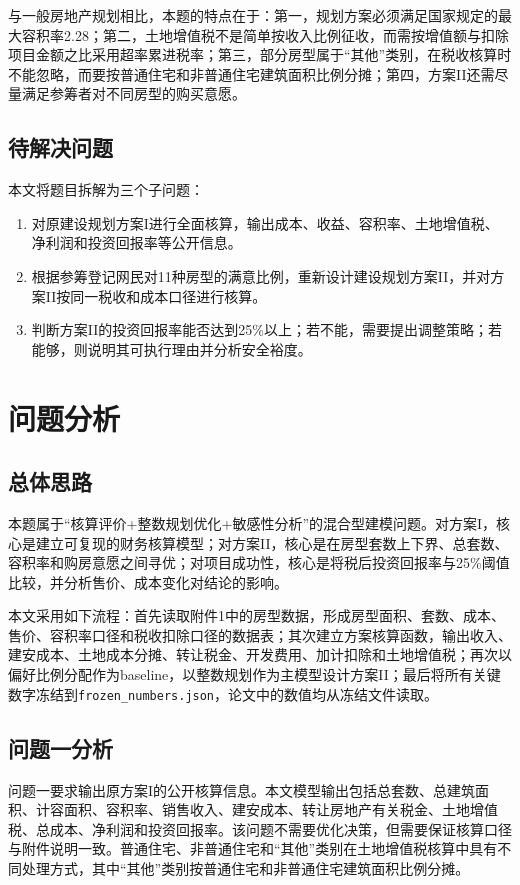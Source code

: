 \documentclass[UTF8,12pt,a4paper]{ctexart}
\begin{document}
与一般房地产规划相比，本题的特点在于：第一，规划方案必须满足国家规定的最大容积率2.28；第二，土地增值税不是简单按收入比例征收，而需按增值额与扣除项目金额之比采用超率累进税率；第三，部分房型属于“其他”类别，在税收核算时不能忽略，而要按普通住宅和非普通住宅建筑面积比例分摊；第四，方案II还需尽量满足参筹者对不同房型的购买意愿。

\subsection{待解决问题}
本文将题目拆解为三个子问题：
\begin{enumerate}[label=\textbf{问题\arabic*：},leftmargin=3.2em]
\item 对原建设规划方案I进行全面核算，输出成本、收益、容积率、土地增值税、净利润和投资回报率等公开信息。
\item 根据参筹登记网民对11种房型的满意比例，重新设计建设规划方案II，并对方案II按同一税收和成本口径进行核算。
\item 判断方案II的投资回报率能否达到25\%以上；若不能，需要提出调整策略；若能够，则说明其可执行理由并分析安全裕度。
\end{enumerate}

\section{问题分析}
\subsection{总体思路}
本题属于“核算评价+整数规划优化+敏感性分析”的混合型建模问题。对方案I，核心是建立可复现的财务核算模型；对方案II，核心是在房型套数上下界、总套数、容积率和购房意愿之间寻优；对项目成功性，核心是将税后投资回报率与25\%阈值比较，并分析售价、成本变化对结论的影响。

本文采用如下流程：首先读取附件1中的房型数据，形成房型面积、套数、成本、售价、容积率口径和税收扣除口径的数据表；其次建立方案核算函数，输出收入、建安成本、土地成本分摊、转让税金、开发费用、加计扣除和土地增值税；再次以偏好比例分配作为baseline，以整数规划作为主模型设计方案II；最后将所有关键数字冻结到\texttt{frozen\_numbers.json}，论文中的数值均从冻结文件读取。

\subsection{问题一分析}
问题一要求输出原方案I的公开核算信息。本文模型输出包括总套数、总建筑面积、计容面积、容积率、销售收入、建安成本、转让房地产有关税金、土地增值税、总成本、净利润和投资回报率。该问题不需要优化决策，但需要保证核算口径与附件说明一致。普通住宅、非普通住宅和“其他”类别在土地增值税核算中具有不同处理方式，其中“其他”类别按普通住宅和非普通住宅建筑面积比例分摊。
\end{document}
